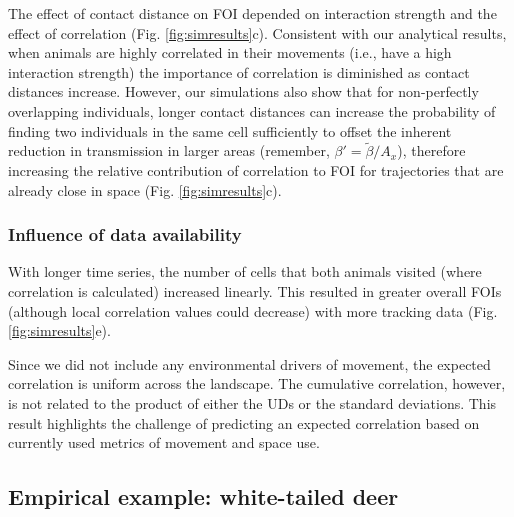 ﻿\documentclass[11pt]{article}
\begin{document}
The effect of contact distance on FOI depended on interaction strength and the effect of correlation (Fig. \ref{fig:simresults}c). Consistent with our analytical results, when animals are highly correlated in their movements (i.e., have a high interaction strength) the importance of correlation is diminished as contact distances increase.
However, our simulations also show that for non-perfectly overlapping individuals, longer contact distances can increase the probability of finding two individuals in the same cell sufficiently to offset the inherent reduction in transmission in larger areas (remember, $\beta' = \tilde{\beta} / A_x$), therefore increasing the relative contribution of correlation to FOI for trajectories that are already close in space (Fig. \ref{fig:simresults}c).

\subsubsection*{Influence of data availability}

 
With longer time series, the number of cells that both animals visited (where correlation is calculated) increased linearly. This resulted in greater overall FOIs (although local correlation values could decrease) with more tracking data (Fig. \ref{fig:simresults}e). 

Since we did not include any environmental drivers of movement, the expected correlation is uniform across the landscape. The cumulative correlation, however, is not related to the product of either the UDs or the standard deviations. This result highlights the challenge of predicting an expected correlation based on currently used metrics of movement and space use.


\subsection*{Empirical example: white-tailed deer}
\end{document}
